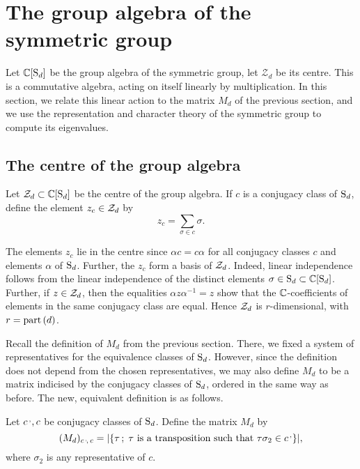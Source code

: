 \section{The group algebra of the symmetric group}

Let $\mathbb{C}[\operatorname{S}_d]$ be the group algebra of the symmetric group, let $\mathcal{Z}_d$ be its centre. This is a commutative algebra, acting on itself linearly by multiplication. In this section, we relate this linear action to the matrix $M_d$ of the previous section, and we use the representation and character theory of the symmetric group to compute its eigenvalues.

\subsection{The centre of the group algebra}

\begin{defi}
 Let $\mathcal{Z}_d\subset\mathbb{C}[\operatorname{S}_d]$ be the centre of the group algebra. If $c$ is a conjugacy class of $\operatorname{S}_d$, define the element $z_c\in\mathcal{Z}_d$ by
 \[
  z_c=\sum_{\sigma\in c}\sigma.
 \]
\end{defi}

\begin{rmk}
 The elements $z_c$ lie in the centre since $\alpha c=c\alpha$ for all conjugacy classes $c$ and elements $\alpha$ of $\operatorname{S}_d$. Further, the $z_c$ form a basis of $\mathcal{Z}_d$. Indeed, linear independence follows from the linear independence of the distinct elements $\sigma\in\operatorname{S}_d\subset\mathbb{C}[\operatorname{S}_d]$. Further, if $z\in\mathcal{Z}_d$, then the equalities $\alpha z\alpha^{-1}=z$ show that the $\mathbb{C}$-coefficients of elements in the same conjugacy class are equal. Hence $\mathcal{Z}_d$ is $r$-dimensional, with $r=\operatorname{part}{(d)}$.
\end{rmk}

Recall the definition of $M_d$ from the previous section. There, we fixed a system of representatives for the equivalence classes of $\operatorname{S}_d$. However, since the definition does not depend from the chosen representatives, we may also define $M_d$ to be a matrix indicised by the conjugacy classes of $\operatorname{S}_d$, ordered in the same way as before. The new, equivalent definition is as follows.

\begin{defi} Let $c^\textrm{\,,},c$ be conjugacy classes of $\operatorname{S}_d$. Define the matrix $M_d$ by
\[(M_d)_{c^\textrm{\,,}\!,\, c} = |\{\tau\,;\; \tau\text{ is a transposition such that }\tau\sigma_2\in c^\textrm{\,,}\}|,\] where $\sigma_2$ is any representative of $c$.
\end{defi}

